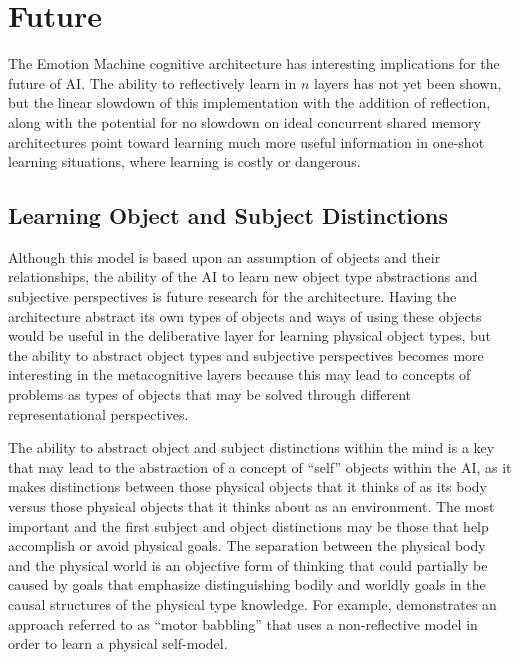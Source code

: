 \chapter{Future}\label{chapter:future}

The Emotion Machine cognitive architecture has interesting
implications for the future of AI.  The ability to reflectively learn
in $n$ layers has not yet been shown, but the linear slowdown of this
implementation with the addition of reflection, along with the
potential for no slowdown on ideal concurrent shared memory
architectures point toward learning much more useful information in
one-shot learning situations, where learning is costly or dangerous.

\section{Learning Object and Subject Distinctions}
\label{section:objective_reflection}

Although this model is based upon an assumption of objects and their
relationships, the ability of the AI to learn new object type
abstractions and subjective perspectives is future research for the
architecture.  Having the architecture abstract its own types of
objects and ways of using these objects would be useful in the
deliberative layer for learning physical object types, but the ability
to abstract object types and subjective perspectives becomes more
interesting in the metacognitive layers because this may lead to
concepts of problems as types of objects that may be solved through
different representational perspectives.

The ability to abstract object and subject distinctions within the
mind is a key that may lead to the abstraction of a concept of
``self'' objects within the AI, as it makes distinctions between those
physical objects that it thinks of as its body versus those physical
objects that it thinks about as an environment.  The most important
and the first subject and object distinctions may be those that help
accomplish or avoid physical goals.  The separation between the
physical body and the physical world is an objective form of thinking
that could partially be caused by goals that emphasize distinguishing
bodily and worldly goals in the causal structures of the physical type
knowledge.  For example, \cite{bongard:2006} demonstrates an approach
referred to as ``motor babbling'' that uses a non-reflective model in
order to learn a physical self-model.


